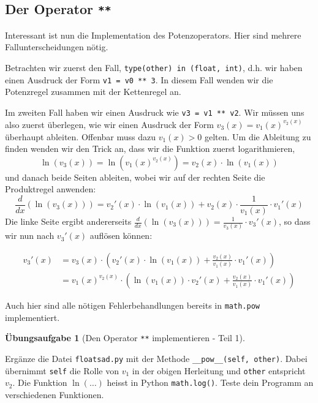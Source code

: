 \documentclass[
  a4paper,
  DIV=11]{scrreprt}
\theoremstyle{definition}
\newtheorem{exercise}{Übungsaufgabe}[chapter]
\theoremstyle{definition}
\theoremstyle{remark}
\begin{document}
\hypertarget{sec-sadPowerOperator}{%
\subsection{\texorpdfstring{Der Operator
\texttt{**}}{Der Operator **}}\label{sec-sadPowerOperator}}

Interessant ist nun die Implementation des Potenzoperators. Hier sind
mehrere Fallunterscheidungen nötig.

Betrachten wir zuerst den Fall, \texttt{type(other)\ in\ (float,\ int)},
d.h. wir haben einen Ausdruck der Form \texttt{v1\ =\ v0\ **\ 3}. In
diesem Fall wenden wir die Potenzregel zusammen mit der Kettenregel an.

Im zweiten Fall haben wir einen Ausdruck wie \texttt{v3\ =\ v1\ **\ v2}.
Wir müssen uns also zuerst überlegen, wie wir einen Ausdruck der Form
\(v_3 (x) = v_1(x) ^{v_2 (x)}\) überhaupt ableiten. Offenbar muss dazu
\(v_1(x) > 0\) gelten. Um die Ableitung zu finden wenden wir den Trick
an, dass wir die Funktion zuerst logarithmieren, \[
\ln(v_3(x)) = \ln(v_1(x) ^{v_2 (x)}) = v_2(x) \cdot \ln(v_1(x))
\] und danach beide Seiten ableiten, wobei wir auf der rechten Seite die
Produktregel anwenden: \[
\frac{d}{dx}(\ln(v_3(x))) = v_2'(x) \cdot \ln(v_1(x)) + v_2(x) \cdot \frac{1}{v_1(x)} \cdot v_1'(x)
\] Die linke Seite ergibt andererseits
\(\frac{d}{dx}(\ln(v_3(x))) = \frac{1}{v_3(x)}\cdot v_3'(x)\), so dass
wir nun nach \(v_3'(x)\) auflösen können:

\begin{align*}
    v_3'(x) &= v_3(x) \cdot \left( v_2'(x) \cdot \ln(v_1(x)) + \frac{v_2(x)}{v_1(x)} \cdot v_1'(x) \right) \\ 
    &= v_1(x) ^{v_2 (x)} \cdot \left( \ln(v_1(x)) \cdot v_2'(x) + \frac{v_2(x)}{v_1(x)} \cdot v_1'(x) \right)
\end{align*}

Auch hier sind alle nötigen Fehlerbehandlungen bereits in
\texttt{math.pow} implementiert.

\begin{exercise}[Den Operator \texttt{**} implementieren - Teil
1]\protect\hypertarget{exr-ImplementPow}{}\label{exr-ImplementPow}

Ergänze die Datei \texttt{floatsad.py} mit der Methode
\texttt{\_\_pow\_\_(self,\ other)}. Dabei übernimmt \texttt{self} die
Rolle von \(v_1\) in der obigen Herleitung und \texttt{other} entspricht
\(v_2\). Die Funktion \(\ln(\ldots)\) heisst in Python
\texttt{math.log()}. Teste dein Programm an verschiedenen Funktionen.

\end{exercise}
\end{document}
